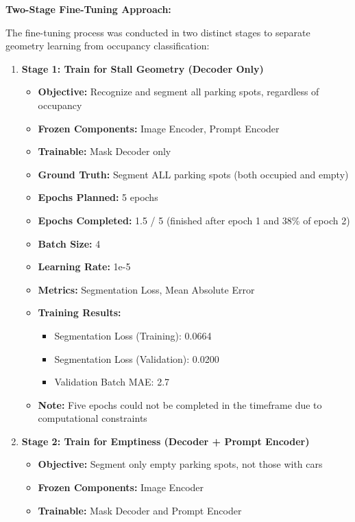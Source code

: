\documentclass[12pt,a4paper]{article}
\begin{document}
\textbf{Two-Stage Fine-Tuning Approach:}

The fine-tuning process was conducted in two distinct stages to separate geometry learning from occupancy classification:

\begin{enumerate}
    \item \textbf{Stage 1: Train for Stall Geometry (Decoder Only)}
    \begin{itemize}
        \item \textbf{Objective:} Recognize and segment all parking spots, regardless of occupancy
        \item \textbf{Frozen Components:} Image Encoder, Prompt Encoder
        \item \textbf{Trainable:} Mask Decoder only
        \item \textbf{Ground Truth:} Segment ALL parking spots (both occupied and empty)
        \item \textbf{Epochs Planned:} 5 epochs
        \item \textbf{Epochs Completed:} 1.5 / 5 (finished after epoch 1 and 38\% of epoch 2)
        \item \textbf{Batch Size:} 4
        \item \textbf{Learning Rate:} 1e-5
        \item \textbf{Metrics:} Segmentation Loss, Mean Absolute Error
        \item \textbf{Training Results:}
        \begin{itemize}
            \item Segmentation Loss (Training): 0.0664
            \item Segmentation Loss (Validation): 0.0200
            \item Validation Batch MAE: 2.7
        \end{itemize}
        \item \textbf{Note:} Five epochs could not be completed in the timeframe due to computational constraints
    \end{itemize}
    \item \textbf{Stage 2: Train for Emptiness (Decoder + Prompt Encoder)}
    \begin{itemize}
        \item \textbf{Objective:} Segment only empty parking spots, not those with cars
        \item \textbf{Frozen Components:} Image Encoder
        \item \textbf{Trainable:} Mask Decoder and Prompt Encoder

\end{itemize}
\end{enumerate}
\end{document}
